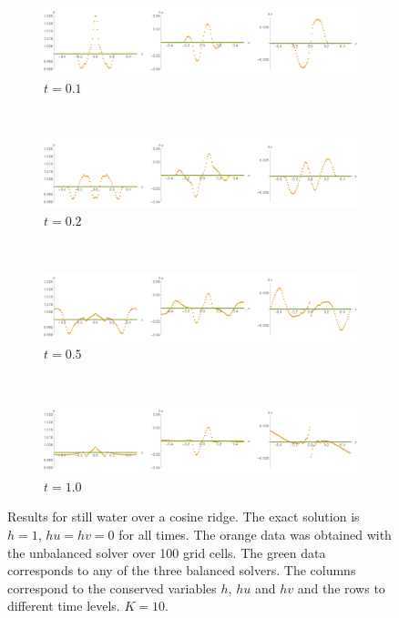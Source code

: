 \begin{figure}
  \centering
  \begin{subfigure}{\textwidth}
    \includegraphics[width=\textwidth]{diagrams/results-still-1}
    \caption{$t = 0.1$}
    \label{fig:results-still-1}
  \end{subfigure} \\
  \begin{subfigure}{\textwidth}
    \includegraphics[width=\textwidth]{diagrams/results-still-2}
    \caption{$t = 0.2$}
    \label{fig:results-still-2}
  \end{subfigure} \\
  \begin{subfigure}{\textwidth}
    \includegraphics[width=\textwidth]{diagrams/results-still-5}
    \caption{$t = 0.5$}
    \label{fig:results-still-5}
  \end{subfigure} \\
  \begin{subfigure}{\textwidth}
    \includegraphics[width=\textwidth]{diagrams/results-still-10}
    \caption{$t = 1.0$}
    \label{fig:results-still-10}
  \end{subfigure}
  \caption{Results for still water over a cosine ridge. The exact solution is $h = 1$, $hu = hv = 0$ for all times. The orange data was obtained with the unbalanced solver over 100 grid cells. The green data corresponds to any of the three balanced solvers. The columns correspond to the conserved variables $h$, $hu$ and $hv$ and the rows to different time levels. $K = 10$.}
  \label{fig:results-still}
\end{figure}

